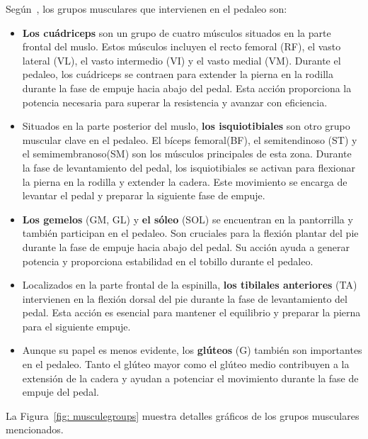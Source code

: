Según~\cite{Losmúscu21}, los grupos musculares que intervienen en el pedaleo son:
\begin{itemize}
    \item \textbf{Los cuádriceps} son un grupo de cuatro músculos situados en la parte frontal del muslo. Estos músculos incluyen el recto femoral (RF), el vasto lateral (VL), el vasto intermedio (VI) y el vasto medial (VM). Durante el pedaleo, los cuádriceps se contraen para extender la pierna en la rodilla durante la fase de empuje hacia abajo del pedal. Esta acción proporciona la potencia necesaria para superar la resistencia y avanzar con eficiencia.
    
    \item Situados en la parte posterior del muslo, \textbf{los isquiotibiales} son otro grupo muscular clave en el pedaleo. El bíceps femoral(BF), el semitendinoso (ST) y el semimembranoso(SM) son los músculos principales de esta zona. Durante la fase de levantamiento del pedal, los isquiotibiales se activan para flexionar la pierna en la rodilla y extender la cadera. Este movimiento se encarga de levantar el pedal y preparar la siguiente fase de empuje.
    
    \item \textbf{Los gemelos} (GM, GL) y \textbf{el sóleo} (SOL) se encuentran en la pantorrilla y también participan en el pedaleo. Son cruciales para la flexión plantar del pie durante la fase de empuje hacia abajo del pedal. Su acción ayuda a generar potencia y proporciona estabilidad en el tobillo durante el pedaleo.
    
    \item Localizados en la parte frontal de la espinilla, \textbf{los tibilales anteriores} (TA) intervienen en la flexión dorsal del pie durante la fase de levantamiento del pedal. Esta acción es esencial para mantener el equilibrio y preparar la pierna para el siguiente empuje.
    
    \item Aunque su papel es menos evidente, los \textbf{glúteos} (G) también son importantes en el pedaleo. Tanto el glúteo mayor como el glúteo medio contribuyen a la extensión de la cadera y ayudan a potenciar el movimiento durante la fase de empuje del pedal.
\end{itemize}

La Figura~\ref{fig: musculegroups} muestra detalles gráficos de los grupos musculares mencionados.

